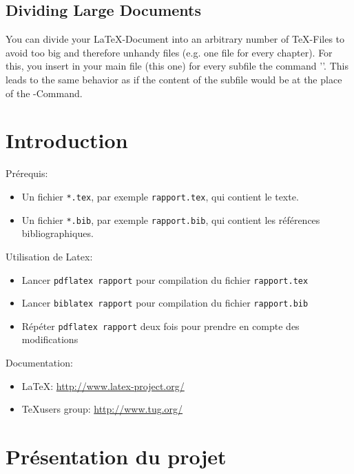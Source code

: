 \documentclass{article}
\begin{document}
\subsection{Dividing Large Documents}
\label{dividing}
You can divide your \LaTeX-Document into an arbitrary number of \TeX-Files
to avoid too big and therefore unhandy files (e.g. one file for every chapter).
For this, you insert in your main file (this one) for every subfile
the command '\verb##'. This leads to the same behavior
as if the content of the subfile would be at the place of the
\verb##-Command.


\appendix
\section{Introduction}\label{sec:intro}

Prérequis:
\begin{itemize}
\item Un fichier \texttt{*.tex}, par exemple \texttt{rapport.tex}, qui
  contient le texte.
\item Un fichier \texttt{*.bib}, par exemple \texttt{rapport.bib}, qui
  contient les références bibliographiques.
\end{itemize}

Utilisation de Latex:
\begin{itemize}
\item Lancer \texttt{pdflatex rapport} pour compilation du fichier
  \texttt{rapport.tex}
\item Lancer \texttt{biblatex rapport} pour compilation du fichier
  \texttt{rapport.bib}
\item Répéter \texttt{pdflatex rapport} deux fois pour prendre en
  compte des modifications
\end{itemize}

Documentation:
\begin{itemize}
\item \LaTeX: \url{http://www.latex-project.org/}
\item \TeX users group: \url{http://www.tug.org/}
\end{itemize}


\section{Présentation du projet}
\end{document}
